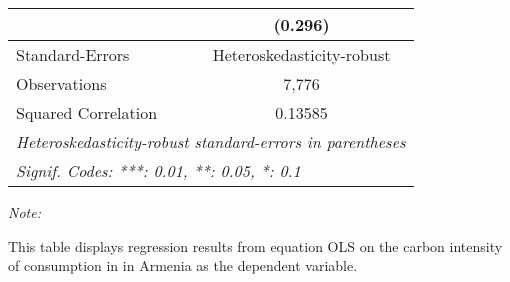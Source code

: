 \begin{table}[htbp!]
\begin{adjustbox}{width = 1\textwidth, max height = 0.95\textheight, center}
\begin{threeparttable}[b]
\begin{tabular}{lc}
                                & (0.296)\\   
            \midrule 
            Standard-Errors     & Heteroskedasticity-robust \\   
            Observations        & 7,776\\  
            Squared Correlation & 0.13585\\  
            \midrule \midrule
            \multicolumn{2}{l}{\emph{Heteroskedasticity-robust standard-errors in parentheses}}\\
            \multicolumn{2}{l}{\emph{Signif. Codes: ***: 0.01, **: 0.05, *: 0.1}}\\
         \end{tabular}
         
         \begin{tablenotes}\item \medskip \textit{Note:}
            \item This table displays regression results from equation OLS on the carbon intensity of consumption in  in Armenia as the dependent variable. 
         \end{tablenotes}
      \end{threeparttable}
   \end{adjustbox}
\end{table}


